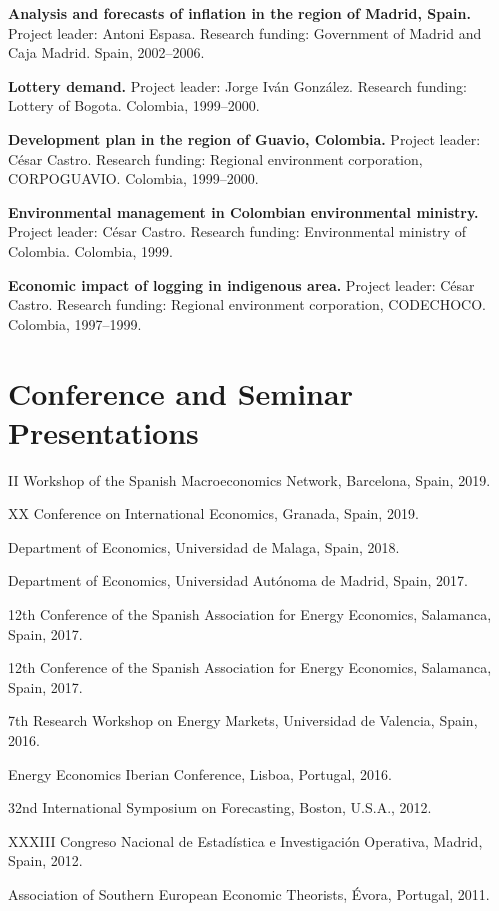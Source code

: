 \documentclass[11pt]{article}\usepackage[]{graphicx}\usepackage[]{color}
\begin{document}
 \textbf{Analysis and forecasts of inflation in the region of Madrid, Spain.} Project leader: Antoni Espasa. Research funding: Government of Madrid and Caja Madrid. Spain, 2002--2006.

 \textbf{Lottery demand.} Project leader: Jorge Iván González. Research funding: Lottery of Bogota. Colombia, 1999--2000.

 \textbf{Development plan in the region of Guavio, Colombia.} Project leader: César Castro. Research funding: Regional environment corporation, CORPOGUAVIO. Colombia, 1999--2000.

 \textbf{Environmental management in Colombian environmental ministry.} Project leader: César Castro. Research funding: Environmental ministry of Colombia. Colombia, 1999.

 \textbf{Economic impact of logging in indigenous area.} Project leader: César Castro. Research funding: Regional environment corporation, CODECHOCO. Colombia, 1997--1999.


\section{Conference and Seminar Presentations} 

II Workshop of the Spanish Macroeconomics Network, Barcelona, Spain, 2019.

 XX Conference on International Economics, Granada, Spain, 2019.
 
 Department of Economics, Universidad de Malaga, Spain, 2018.
 
 Department of Economics, Universidad Autónoma de Madrid, Spain, 2017.
 
 12th Conference of the Spanish Association for Energy Economics, Salamanca, Spain, 2017.
 
 12th Conference of the Spanish Association for Energy Economics, Salamanca, Spain, 2017.
 
 7th Research Workshop on Energy Markets, Universidad de Valencia, Spain, 2016.
 
 Energy Economics Iberian Conference, Lisboa, Portugal, 2016.
 
 32nd International Symposium on Forecasting, Boston, U.S.A., 2012.

 XXXIII Congreso Nacional de Estadística e Investigación Operativa, Madrid, Spain, 2012.
 
 Association of Southern European Economic Theorists, Évora, Portugal, 2011.
\end{document}
